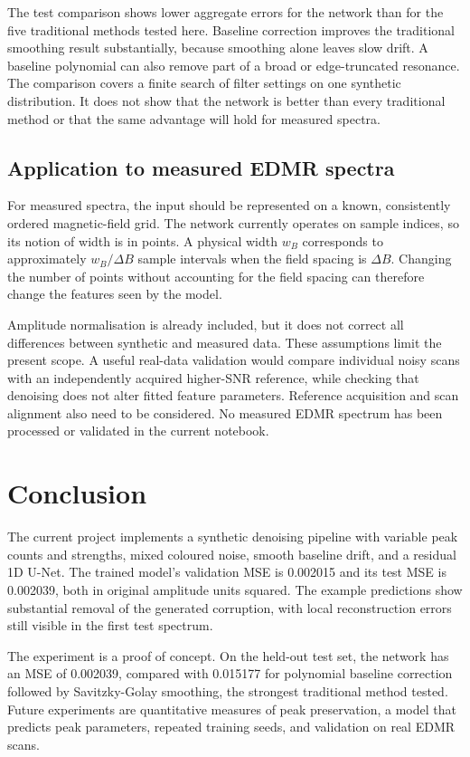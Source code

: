 The test comparison shows lower aggregate errors for the network than for the five traditional methods tested here. Baseline correction improves the traditional smoothing result substantially, because smoothing alone leaves slow drift. A baseline polynomial can also remove part of a broad or edge-truncated resonance. The comparison covers a finite search of filter settings on one synthetic distribution. It does not show that the network is better than every traditional method or that the same advantage will hold for measured spectra.

\subsection{Application to measured EDMR spectra}

For measured spectra, the input should be represented on a known, consistently ordered magnetic-field grid. The network currently operates on sample indices, so its notion of width is in points. A physical width $w_B$ corresponds to approximately $w_B/\Delta B$ sample intervals when the field spacing is $\Delta B$. Changing the number of points without accounting for the field spacing can therefore change the features seen by the model.

Amplitude normalisation is already included, but it does not correct all differences between synthetic and measured data. These assumptions limit the present scope. A useful real-data validation would compare individual noisy scans with an independently acquired higher-SNR reference, while checking that denoising does not alter fitted feature parameters. Reference acquisition and scan alignment also need to be considered. No measured EDMR spectrum has been processed or validated in the current notebook.

\section{Conclusion}

The current project implements a synthetic denoising pipeline with variable peak counts and strengths, mixed coloured noise, smooth baseline drift, and a residual 1D U-Net. The trained model's validation MSE is 0.002015 and its test MSE is 0.002039, both in original amplitude units squared. The example predictions show substantial removal of the generated corruption, with local reconstruction errors still visible in the first test spectrum.

The experiment is a proof of concept. On the held-out test set, the network has an MSE of 0.002039, compared with 0.015177 for polynomial baseline correction followed by Savitzky-Golay smoothing, the strongest traditional method tested. Future experiments are quantitative measures of peak preservation, a model that predicts peak parameters, repeated training seeds, and validation on real EDMR scans.
